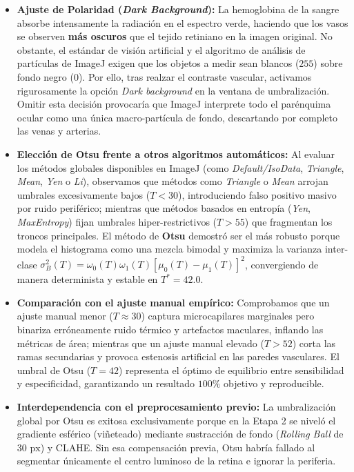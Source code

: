 \documentclass[11pt,a4paper]{article}
\begin{document}
\begin{itemize}
    \item \textbf{Ajuste de Polaridad (\textit{Dark Background}):} La hemoglobina de la sangre absorbe intensamente la radiación en el espectro verde, haciendo que los vasos se observen \textbf{más oscuros} que el tejido retiniano en la imagen original. No obstante, el estándar de visión artificial y el algoritmo de análisis de partículas de ImageJ exigen que los objetos a medir sean blancos ($255$) sobre fondo negro ($0$). Por ello, tras realzar el contraste vascular, activamos rigurosamente la opción \textit{Dark background} en la ventana de umbralización. Omitir esta decisión provocaría que ImageJ interprete todo el parénquima ocular como una única macro-partícula de fondo, descartando por completo las venas y arterias.
    \item \textbf{Elección de Otsu frente a otros algoritmos automáticos:} Al evaluar los métodos globales disponibles en ImageJ (como \textit{Default/IsoData}, \textit{Triangle}, \textit{Mean}, \textit{Yen} o \textit{Li}), observamos que métodos como \textit{Triangle} o \textit{Mean} arrojan umbrales excesivamente bajos ($T < 30$), introduciendo falso positivo masivo por ruido periférico; mientras que métodos basados en entropía (\textit{Yen}, \textit{MaxEntropy}) fijan umbrales hiper-restrictivos ($T > 55$) que fragmentan los troncos principales. El método de \textbf{Otsu} demostró ser el más robusto porque modela el histograma como una mezcla bimodal y maximiza la varianza inter-clase $\sigma_B^2(T) = \omega_0(T)\omega_1(T)[\mu_0(T) - \mu_1(T)]^2$, convergiendo de manera determinista y estable en $T^* = 42.0$.
    \item \textbf{Comparación con el ajuste manual empírico:} Comprobamos que un ajuste manual menor ($T \approx 30$) captura microcapilares marginales pero binariza erróneamente ruido térmico y artefactos maculares, inflando las métricas de área; mientras que un ajuste manual elevado ($T > 52$) corta las ramas secundarias y provoca estenosis artificial en las paredes vasculares. El umbral de Otsu ($T = 42$) representa el óptimo de equilibrio entre sensibilidad y especificidad, garantizando un resultado $100\%$ objetivo y reproducible.
    \item \textbf{Interdependencia con el preprocesamiento previo:} La umbralización global por Otsu es exitosa exclusivamente porque en la Etapa 2 se niveló el gradiente esférico (viñeteado) mediante sustracción de fondo (\textit{Rolling Ball} de $30\text{ px}$) y CLAHE. Sin esa compensación previa, Otsu habría fallado al segmentar únicamente el centro luminoso de la retina e ignorar la periferia.
\end{itemize}
\end{document}
